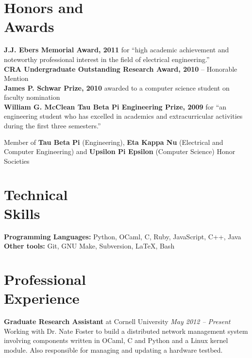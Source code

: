 \documentclass[margin,line]{resume}
\begin{document}
\begin{resume}
    \section{Honors and\\Awards}

    {\bf J.J. Ebers Memorial Award, 2011} for ``high academic achievement and
    noteworthy professional interest in the field of electrical engineering.''\\
    {\bf CRA Undergraduate Outstanding Research Award, 2010} -- Honorable
    Mention \\
    {\bf James P. Schwar Prize, 2010} awarded to a computer science student on
    faculty nomination \\
    {\bf William G. McClean Tau Beta Pi Engineering Prize, 2009} for ``an
    engineering student who has excelled in academics and extracurricular
    activities during the first three semesters.''

    Member of {\bf Tau Beta Pi} (Engineering), {\bf Eta Kappa Nu} (Electrical
    and Computer Engineering) and {\bf Upsilon Pi Epsilon} (Computer Science)
    Honor Societies

    \section{Technical\\ Skills}

    {\bf Programming Languages:} Python, OCaml, C, Ruby, JavaScript, C++, Java\\
    {\bf Other tools:} Git, GNU Make, Subversion, \LaTeX, Bash

    \section{Professional\\Experience}

    {\bf Graduate Research Assistant} at Cornell University \hfill
    {\it May 2012 -- Present} \\
    Working with Dr. Nate Foster to build a distributed network management
    system involving components written in OCaml, C and Python and a Linux
    kernel module. Also responsible for managing and updating a hardware testbed.


\end{resume}
\end{document}
